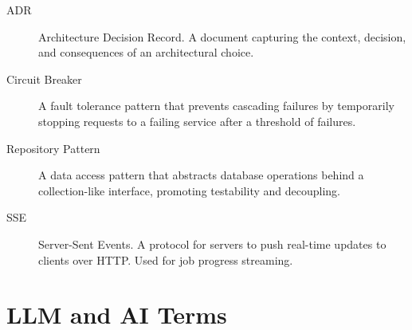 \documentclass[a4paper,twoside]{sapthesis}
\begin{document}
\begin{description}

\item[ADR]
Architecture Decision Record. A document capturing the context, decision, and consequences of an architectural choice.

\item[Circuit Breaker]
A fault tolerance pattern that prevents cascading failures by temporarily stopping requests to a failing service after a threshold of failures.

\item[Repository Pattern]
A data access pattern that abstracts database operations behind a collection-like interface, promoting testability and decoupling.

\item[SSE]
Server-Sent Events. A protocol for servers to push real-time updates to clients over HTTP. Used for job progress streaming.

\end{description}

\section{LLM and AI Terms}
\label{app:glossary:llm}
\end{document}
